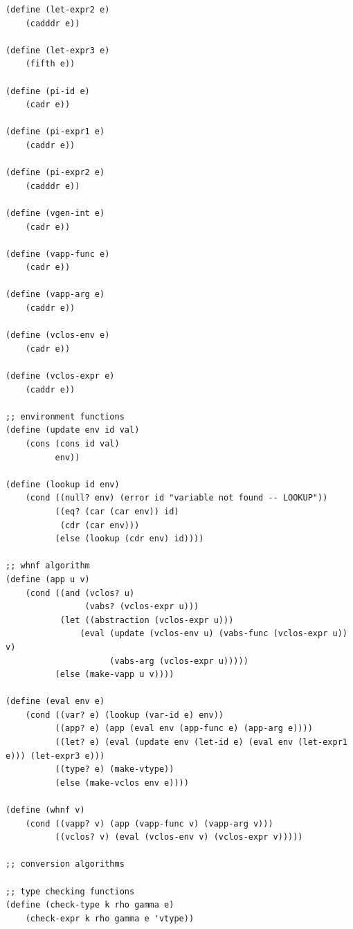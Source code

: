 \documentclass{article}
\begin{document}
\begin{verbatim}
(define (let-expr2 e)
    (cadddr e))

(define (let-expr3 e)
    (fifth e))

(define (pi-id e)
    (cadr e))

(define (pi-expr1 e)
    (caddr e))

(define (pi-expr2 e)
    (cadddr e))

(define (vgen-int e)
    (cadr e))

(define (vapp-func e)
    (cadr e))

(define (vapp-arg e)
    (caddr e))

(define (vclos-env e)
    (cadr e))

(define (vclos-expr e)
    (caddr e))

;; environment functions
(define (update env id val)
    (cons (cons id val)
          env))

(define (lookup id env)
    (cond ((null? env) (error id "variable not found -- LOOKUP"))
          ((eq? (car (car env)) id)
           (cdr (car env)))
          (else (lookup (cdr env) id))))

;; whnf algorithm
(define (app u v)
    (cond ((and (vclos? u)
                (vabs? (vclos-expr u)))
           (let ((abstraction (vclos-expr u)))
               (eval (update (vclos-env u) (vabs-func (vclos-expr u)) v)
                     (vabs-arg (vclos-expr u)))))
          (else (make-vapp u v))))

(define (eval env e)
    (cond ((var? e) (lookup (var-id e) env))
          ((app? e) (app (eval env (app-func e) (app-arg e))))
          ((let? e) (eval (update env (let-id e) (eval env (let-expr1 e))) (let-expr3 e)))
          ((type? e) (make-vtype))
          (else (make-vclos env e))))

(define (whnf v)
    (cond ((vapp? v) (app (vapp-func v) (vapp-arg v)))
          ((vclos? v) (eval (vclos-env v) (vclos-expr v)))))

;; conversion algorithms

;; type checking functions
(define (check-type k rho gamma e)
    (check-expr k rho gamma e 'vtype))


\end{verbatim}
\end{document}
